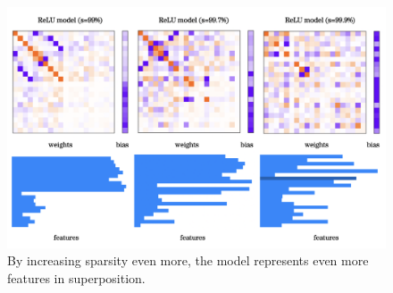 \documentclass{article} %
\begin{document}
\begin{figure}[h]
    \centering
    \includegraphics[width=0.75\linewidth]{demonstrating_superposition/images/sparsity_superposition2.png}
    \captionsetup{font=footnotesize, width=0.7\linewidth} %
    \caption{
        By increasing sparsity even more, the model represents even more
        features in superposition.
    }
    \label{fig:sparsity_2}
\end{figure}



\end{document}
